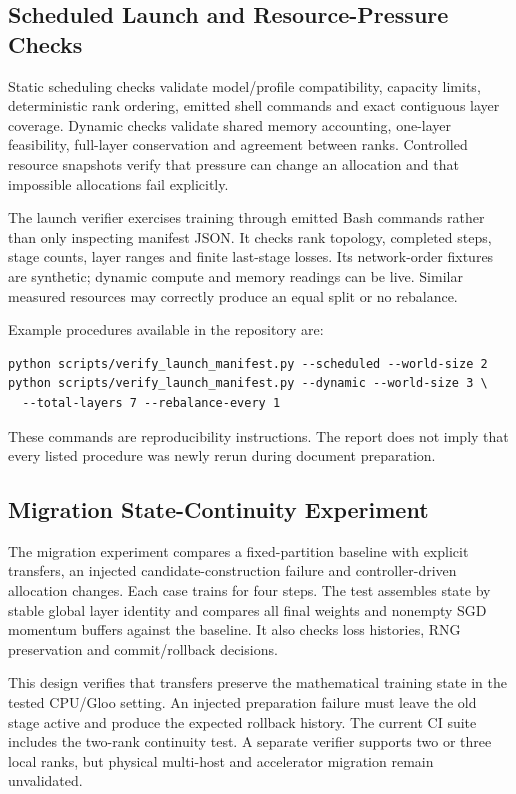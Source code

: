 \subsection{Scheduled Launch and Resource-Pressure Checks}

Static scheduling checks validate model/profile compatibility, capacity limits, deterministic rank ordering, emitted shell commands and exact contiguous layer coverage. Dynamic checks validate shared memory accounting, one-layer feasibility, full-layer conservation and agreement between ranks. Controlled resource snapshots verify that pressure can change an allocation and that impossible allocations fail explicitly.

The launch verifier exercises training through emitted Bash commands rather than only inspecting manifest JSON. It checks rank topology, completed steps, stage counts, layer ranges and finite last-stage losses. Its network-order fixtures are synthetic; dynamic compute and memory readings can be live. Similar measured resources may correctly produce an equal split or no rebalance.

Example procedures available in the repository are:
\begin{lstlisting}
python scripts/verify_launch_manifest.py --scheduled --world-size 2
python scripts/verify_launch_manifest.py --dynamic --world-size 3 \
  --total-layers 7 --rebalance-every 1
\end{lstlisting}
These commands are reproducibility instructions. The report does not imply that every listed procedure was newly rerun during document preparation.

\subsection{Migration State-Continuity Experiment}

The migration experiment compares a fixed-partition baseline with explicit transfers, an injected candidate-construction failure and controller-driven allocation changes. Each case trains for four steps. The test assembles state by stable global layer identity and compares all final weights and nonempty SGD momentum buffers against the baseline. It also checks loss histories, RNG preservation and commit/rollback decisions.

This design verifies that transfers preserve the mathematical training state in the tested CPU/Gloo setting. An injected preparation failure must leave the old stage active and produce the expected rollback history. The current CI suite includes the two-rank continuity test. A separate verifier supports two or three local ranks, but physical multi-host and accelerator migration remain unvalidated.

